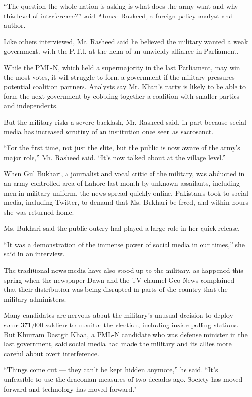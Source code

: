 ``The question the whole nation is asking is what does the army want and
why this level of interference?'' said Ahmed Rasheed, a foreign-policy
analyst and author.

Like others interviewed, Mr. Rasheed said he believed the military
wanted a weak government, with the P.T.I. at the helm of an unwieldy
alliance in Parliament.

While the PML-N, which held a supermajority in the last Parliament, may
win the most votes, it will struggle to form a government if the
military pressures potential coalition partners. Analysts say Mr. Khan's
party is likely to be able to form the next government by cobbling
together a coalition with smaller parties and independents.

But the military risks a severe backlash, Mr. Rasheed said, in part
because social media has increased scrutiny of an institution once seen
as sacrosanct.

``For the first time, not just the elite, but the public is now aware of
the army's major role,'' Mr. Rasheed said. ``It's now talked about at
the village level.''

When Gul Bukhari, a journalist and vocal critic of the military, was
abducted in an army-controlled area of Lahore last month by unknown
assailants, including men in military uniform, the news spread quickly
online. Pakistanis took to social media, including Twitter, to demand
that Ms. Bukhari be freed, and within hours she was returned home.

Ms. Bukhari said the public outcry had played a large role in her quick
release.

``It was a demonstration of the immense power of social media in our
times,'' she said in an interview.

The traditional news media have also stood up to the military, as
happened this spring when the newspaper Dawn and the TV channel Geo News
complained that their distribution was being disrupted in parts of the
country that the military administers.

Many candidates are nervous about the military's unusual decision to
deploy some 371,000 soldiers to monitor the election, including inside
polling stations. But Khurram Dastgir Khan, a PML-N candidate who was
defense minister in the last government, said social media had made the
military and its allies more careful about overt interference.

``Things come out --- they can't be kept hidden anymore,'' he said.
``It's unfeasible to use the draconian measures of two decades ago.
Society has moved forward and technology has moved forward.''

